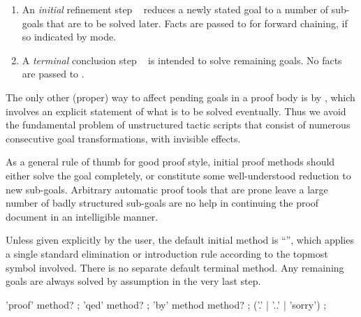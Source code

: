\begin{isabellebody}
\begin{isamarkuptext}
  \begin{enumerate}

  \item An \emph{initial} refinement step \mbox{}~ reduces a newly stated goal to a number
  of sub-goals that are to be solved later.  Facts are passed to
   for forward chaining, if so indicated by  mode.
  
  \item A \emph{terminal} conclusion step \mbox{}~ is intended to solve remaining goals.  No facts are
  passed to .

  \end{enumerate}

  The only other (proper) way to affect pending goals in a proof body
  is by \mbox{}, which involves an explicit statement of
  what is to be solved eventually.  Thus we avoid the fundamental
  problem of unstructured tactic scripts that consist of numerous
  consecutive goal transformations, with invisible effects.

  \medskip As a general rule of thumb for good proof style, initial
  proof methods should either solve the goal completely, or constitute
  some well-understood reduction to new sub-goals.  Arbitrary
  automatic proof tools that are prone leave a large number of badly
  structured sub-goals are no help in continuing the proof document in
  an intelligible manner.

  Unless given explicitly by the user, the default initial method is
  ``\mbox{}'', which applies a single standard elimination
  or introduction rule according to the topmost symbol involved.
  There is no separate default terminal method.  Any remaining goals
  are always solved by assumption in the very last step.

  \begin{rail}
    'proof' method?
    ;
    'qed' method?
    ;
    'by' method method?
    ;
    ('.' | '..' | 'sorry')
    ;
  \end{rail}


\end{isamarkuptext}
\end{isabellebody}
